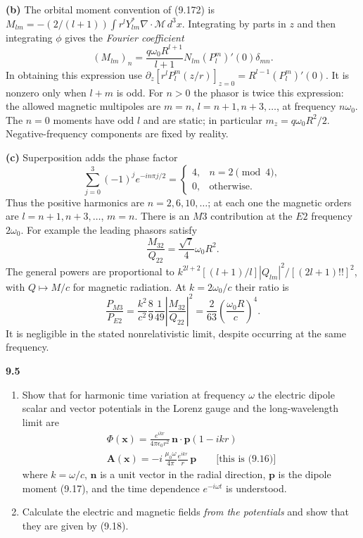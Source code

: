 \textbf{(b)} The orbital moment convention of (9.172) is
$M_{lm}=-(2/(l+1))\int r^lY_{lm}^*\nabla\cdot\mathcal M\,d^3x$.
Integrating by parts in $z$ and then integrating $\phi$ gives the
\emph{Fourier coefficient}
\[
\boxed{(M_{lm})_n=\frac{q\omega_0R^{l+1}}{l+1}
N_{lm}(P_l^m)'(0)\delta_{mn}.}
\]
In obtaining this expression use
$\partial_z[r^lP_l^m(z/r)]_{z=0}=R^{l-1}(P_l^m)'(0)$.
It is nonzero only when $l+m$ is odd. For $n>0$ the phasor is twice
this expression: the allowed magnetic multipoles are
$m=n$, $l=n+1,n+3,\ldots$, at frequency $n\omega_0$.
The $n=0$ moments have odd $l$ and are static; in particular
$m_z=q\omega_0R^2/2$. Negative-frequency components are fixed by reality.

\textbf{(c)} Superposition adds the phase factor
\[
\sum_{j=0}^3(-1)^je^{-in\pi j/2}
=\begin{cases}4,&n=2\pmod4,\\0,&\text{otherwise}.\end{cases}
\]
Thus the positive harmonics are $n=2,6,10,\ldots$; at each one the
magnetic orders are $l=n+1,n+3,\ldots$, $m=n$.
There is an $M3$ contribution at the $E2$ frequency $2\omega_0$.
For example the leading phasors satisfy
\[
\frac{M_{32}}{Q_{22}}=\frac{\sqrt7}{4}\omega_0R^2.
\]
The general powers are proportional to
$k^{2l+2}[(l+1)/l]|Q_{lm}|^2/[(2l+1)!!]^2$, with
$Q\mapsto M/c$ for magnetic radiation. At $k=2\omega_0/c$ their ratio is
\[
\boxed{\frac{P_{M3}}{P_{E2}}
=\frac{k^2}{c^2}\frac{8}{9}\frac1{49}
\left|\frac{M_{32}}{Q_{22}}\right|^2
=\frac{2}{63}\left(\frac{\omega_0R}{c}\right)^4.}
\]
It is negligible in the stated nonrelativistic limit, despite occurring
at the same frequency.

\par\bigskip
\noindent\textbf{9.5}\quad\begin{enumerate}
\item[(a)] Show that for harmonic time variation at frequency $\omega$ the electric dipole scalar and vector potentials in the Lorenz gauge and the long-wavelength limit are
\begin{gather*}
\Phi(\mathbf{x})=\frac{e^{ikr}}{4\pi\epsilon_{0}r^{2}}\,\mathbf{n}\cdot\mathbf{p}(1-ikr)\\[4pt]
\mathbf{A}(\mathbf{x})=-i\,\frac{\mu_{0}\omega}{4\pi}\frac{e^{ikr}}{r}\,\mathbf{p}\qquad\text{[this is (9.16)]}
\end{gather*}
where $k=\omega/c$, $\mathbf{n}$ is a unit vector in the radial direction, $\mathbf{p}$ is the dipole moment (9.17), and the time dependence $e^{-i\omega t}$ is understood.
\item[(b)] Calculate the electric and magnetic fields \emph{from the potentials} and show that they are given by (9.18).
\end{enumerate}
\solution

